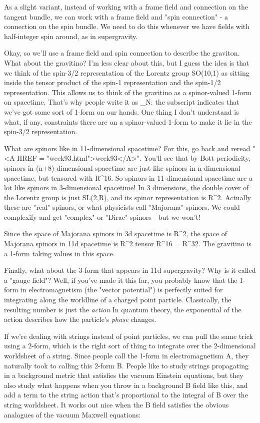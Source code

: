 As a slight variant, instead of working with a frame field and 
connection on the tangent bundle, we can work with a frame field and 
"spin connection" - a connection on the spin bundle.  We need to do this 
whenever we have fields with half-integer spin around, as in supergravity.    
 
Okay, so we'll use a frame field and spin connection to describe the
graviton.  What about the gravitino?  I'm less clear about this, but I
guess the idea is that we think of the spin-3/2 representation of the
Lorentz group SO(10,1) as sitting inside the tensor product of the
spin-1 representation and the spin-1/2 representation.  This allows us
to think of the gravitino as a spinor-valued 1-form on spacetime.
That's why people write it as \psi _{N}: 
the subscript indicates that we've
got some sort of 1-form on our hands.  One thing I don't understand is
what, if any, constraints there are on a spinor-valued 1-form to make
it lie in the spin-3/2 representation.
  
What are spinors like in 11-dimensional spacetime?  For this, go back
and reread "<A HREF = "week93.html">week93</A>".  You'll see
that by Bott periodicity, spinors in (n+8)-dimensional spacetime are
just like spinors in n-dimensional spacetime, but tensored with
R^{16}.  So spinors in 11-dimensional spacetime are a lot like
spinors in 3-dimensional spacetime!  In 3 dimensions, the double cover
of the Lorentz group is just SL(2,R), and its spinor representation is
R^{2}.  Actually these are "real" spinors, or what
physicists call "Majorana" spinors.  We could complexify and
get "complex" or "Dirac" spinors - but we won't!
 
Since the space of Majorana spinors in 3d spacetime is R^{2},
the space of Majorana spinors in 11d spacetime is R^{2} tensor
R^{16} = R^{32}.  The gravitino is a 1-form taking
values in this space.
 
Finally, what about the 3-form that appears in 11d supergravity?  Why is
it called a "gauge field"?  Well, if you've made it this far,
you probably know that the 1-form in electromagnetism (the "vector
potential") is perfectly suited for integrating along the worldline
of a charged point particle.  Classically, the resulting number is just
the \emph{action}  In quantum theory, the exponential of the action describes
how the particle's \emph{phase} changes.
 
If we're dealing with strings instead of point particles, we can pull
the same trick using a 2-form, which is the right sort of thing to
integrate over the 2-dimensional worldsheet of a string.  Since people
call the 1-form in electromagnetism A, they naturally took to calling
this 2-form B.  People like to study strings propagating in a background
metric that satisfies the vacuum Einstein equations, but they also study
what happens when you throw in a background B field like this, and add a
term to the string action that's proportional to the integral of B over
the string worldsheet.  It works out nice when the B field satisfies the
obvious analogues of the vacuum Maxwell equations:
 
